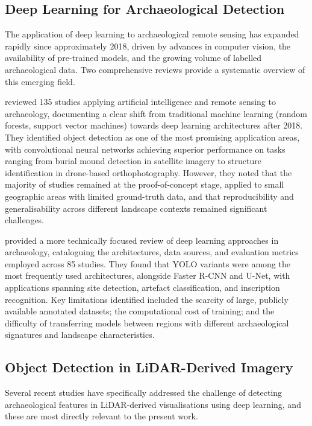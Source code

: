 \documentclass[12pt,a4paper]{article}
\begin{document}
\subsection{Deep Learning for Archaeological Detection}

The application of deep learning to archaeological remote sensing has expanded rapidly since
approximately 2018, driven by advances in computer vision, the availability of pre-trained
models, and the growing volume of labelled archaeological data. Two comprehensive reviews
provide a systematic overview of this emerging field.

\citet{argyrou2022review} reviewed 135 studies applying artificial intelligence and remote
sensing to archaeology, documenting a clear shift from traditional machine learning (random
forests, support vector machines) towards deep learning architectures after 2018. They
identified object detection as one of the most promising application areas, with
convolutional neural networks achieving superior performance on tasks ranging from burial
mound detection in satellite imagery to structure identification in drone-based
orthophotography. However, they noted that the majority of studies remained at the proof-of-concept
stage, applied to small geographic areas with limited ground-truth data, and that
reproducibility and generalisability across different landscape contexts remained
significant challenges.

\citet{kadhim2023critical} provided a more technically focused review of deep learning
approaches in archaeology, cataloguing the architectures, data sources, and evaluation
metrics employed across 85 studies. They found that YOLO variants were among the most
frequently used architectures, alongside Faster R-CNN and U-Net, with applications
spanning site detection, artefact classification, and inscription recognition. Key
limitations identified included the scarcity of large, publicly available annotated
datasets; the computational cost of training; and the difficulty of transferring models
between regions with different archaeological signatures and landscape characteristics.

\subsection{Object Detection in LiDAR-Derived Imagery}

Several recent studies have specifically addressed the challenge of detecting archaeological
features in LiDAR-derived visualisations using deep learning, and these are most directly
relevant to the present work.
\end{document}
